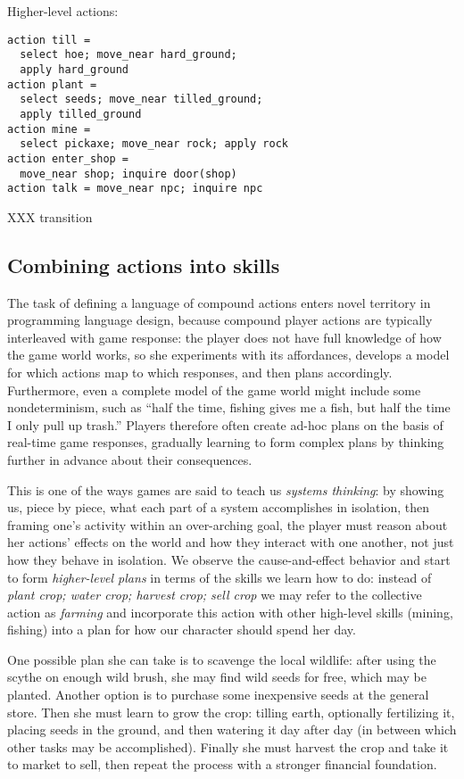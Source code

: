 Higher-level actions:
\begin{verbatim}
action till = 
  select hoe; move_near hard_ground; 
  apply hard_ground
action plant = 
  select seeds; move_near tilled_ground; 
  apply tilled_ground
action mine = 
  select pickaxe; move_near rock; apply rock
action enter_shop = 
  move_near shop; inquire door(shop)
action talk = move_near npc; inquire npc
\end{verbatim}

XXX transition


\subsection{Combining actions into skills}

The task of defining a language of compound actions enters novel territory
in programming language design, because compound player actions
are typically interleaved with game response: the player does not have full
knowledge of how the game world works, so she experiments with its
affordances, develops a model for which actions map to which responses, and
then plans accordingly. Furthermore, even a complete model of the game
world might include some nondeterminism, such as ``half the time, fishing
gives me a fish, but half the time I only pull up trash.'' Players
therefore often create ad-hoc plans on the basis of real-time game
responses, gradually learning to form complex plans by thinking further in
advance about their consequences.

This is one of the ways games are said to teach us {\em systems thinking}:
by showing us, piece by piece, what each part of a system accomplishes in
isolation, then framing one's activity within an over-arching goal, the
player must reason about her actions' effects on the world and how they
interact with one another, not just how they behave in isolation. We
observe the cause-and-effect behavior and start to form {\em higher-level
plans} in terms of the skills we learn how to do: instead of {\em plant
crop; water crop; harvest crop; sell crop} we may refer to the collective
action as {\em farming} and incorporate this action with other high-level
skills (mining, fishing) into a plan for how our character should spend her
day.

One possible plan she can take is to scavenge the local wildlife: after
using the scythe on enough wild brush, she may find wild seeds for free,
which may be planted. Another option is to purchase some inexpensive seeds
at the general store. Then she must learn to grow the crop: tilling earth,
optionally fertilizing it, placing seeds in the ground, and then watering
it day after day (in between which other tasks may be accomplished).
Finally she must harvest the crop and take it to market to sell, then
repeat the process with a stronger financial foundation.

